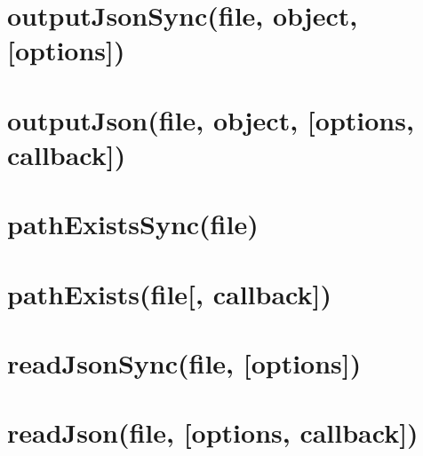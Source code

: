 \documentclass[twoside]{book}
\newcommand{\+}{\discretionary{\mbox{\scriptsize$\hookleftarrow$}}{}{}}
\begin{document}
\chapter{output\+Json\+Sync(file, object, \mbox{[}options\mbox{]})}
\label{md__c_1_workspace_demo_src_main_script_node_modules_fs-extra_docs_output_json-sync}

\chapter{output\+Json(file, object, \mbox{[}options, callback\mbox{]})}
\label{md__c_1_workspace_demo_src_main_script_node_modules_fs-extra_docs_output_json}

\chapter{path\+Exists\+Sync(file)}
\label{md__c_1_workspace_demo_src_main_script_node_modules_fs-extra_docs_path_exists-sync}

\chapter{path\+Exists(file\mbox{[}, callback\mbox{]})}
\label{md__c_1_workspace_demo_src_main_script_node_modules_fs-extra_docs_path_exists}

\chapter{read\+Json\+Sync(file, \mbox{[}options\mbox{]})}
\label{md__c_1_workspace_demo_src_main_script_node_modules_fs-extra_docs_read_json-sync}

\chapter{read\+Json(file, \mbox{[}options, callback\mbox{]})}
\label{md__c_1_workspace_demo_src_main_script_node_modules_fs-extra_docs_read_json}

\end{document}
